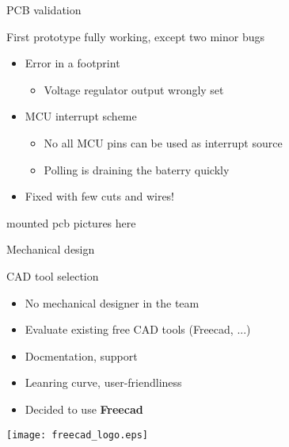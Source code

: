 \documentclass[compress,red]{beamer}
\begin{document}
\begin{frame}{PCB validation}

  \begin{block}{First prototype fully working, except two minor bugs}
    \begin{itemize}
    \item Error in a footprint
      \begin{itemize}
      \item Voltage regulator output wrongly set
      \end{itemize}
    \item MCU interrupt scheme
      \begin{itemize}
      \item No all MCU pins can be used as interrupt source
      \item Polling is draining the baterry quickly
      \end{itemize}
    \item Fixed with few cuts and wires!
    \end{itemize}
  \end{block}

  \begin{center}
    mounted pcb pictures here
  \end{center}

  \note[item]{}

\end{frame}

\begin{frame}{Mechanical design}

  \begin{block}{CAD tool selection}
    \begin{itemize}
    \item No mechanical designer in the team
    \item Evaluate existing free CAD tools (Freecad, ...)
    \item Docmentation, support
    \item Leanring curve, user-friendliness
    \end{itemize}
  \end{block}

  \begin{itemize}
  \item Decided to use \textbf{Freecad}
  \end{itemize}

  \begin{center}
    \texttt{[image: freecad\_logo.eps]}
  \end{center}

\end{frame}
\end{document}
